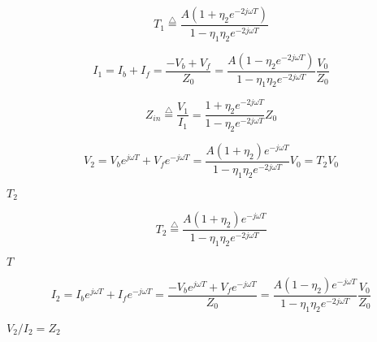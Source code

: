 {\newpage\clearpage
{}%
\begin{displaymath} T_1\stackrel{\triangle}{=}\frac{A(1+\eta_2e^{-2j\omega T})}{1-\eta_1\eta_2e^{-2j\omega T}}	\end{displaymath}%
\lthtmldisplayZ
\lthtmlcheckvsize\clearpage}

{\newpage\clearpage
{}%
\begin{displaymath}  I_1=I_b+I_f=\frac{-V_b+V_f}{Z_0}
=\frac{A(1-\eta_2e^{-2j\omega T})}{1-\eta_1\eta_2e^{-2j\omega T}} \frac{V_0}{Z_0}	\end{displaymath}%
\lthtmldisplayZ
\lthtmlcheckvsize\clearpage}

{\newpage\clearpage
{}%
\begin{displaymath} Z_{in}\stackrel{\triangle}{=}\frac{V_1}{I_1}=\frac{1+\eta_2e^{-2j\omega T}}{1-\eta_2e^{-2j\omega T}}
Z_0 \end{displaymath}%
\lthtmldisplayZ
\lthtmlcheckvsize\clearpage}

{\newpage\clearpage
{}%
\begin{displaymath}  V_2=V_be^{j\omega T}+V_fe^{-j\omega T}
=\frac{A(1+\eta_2)e^{-j\omega T}}{1-\eta_1\eta_2e^{-2j\omega T}}V_0 = T_2V_0 \end{displaymath}%
\lthtmldisplayZ
\lthtmlcheckvsize\clearpage}

{\newpage\clearpage
{}%
$T_2$%
\lthtmlinlinemathZ
\lthtmlcheckvsize\clearpage}

{\newpage\clearpage
{}%
\begin{displaymath} T_2\stackrel{\triangle}{=}\frac{A(1+\eta_2)e^{-j\omega T}}{1-\eta_1\eta_2e^{-2j\omega T}}	\end{displaymath}%
\lthtmldisplayZ
\lthtmlcheckvsize\clearpage}

{\newpage\clearpage
{}%
$T$%
\lthtmlinlinemathZ
\lthtmlcheckvsize\clearpage}

{\newpage\clearpage
{}%
\begin{displaymath}  I_2=I_be^{j\omega T}+I_fe^{-j\omega T}=\frac{-V_be^{j\omega T}+V_fe^{-j\omega T}}{Z_0}
=\frac{A(1-\eta_2)e^{-j\omega T}}{1-\eta_1\eta_2e^{-2j\omega T}} \frac{V_0}{Z_0}	\end{displaymath}%
\lthtmldisplayZ
\lthtmlcheckvsize\clearpage}

{\newpage\clearpage
{}%
$V_2/I_2=Z_2$%
\lthtmlinlinemathZ
\lthtmlcheckvsize\clearpage}

